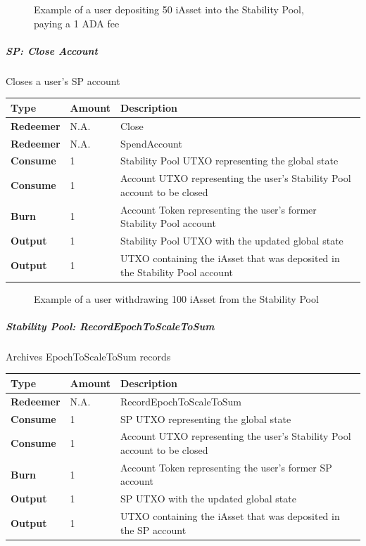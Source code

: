 \documentclass{article}
\begin{document}
\begin{sloppypar}
\hypertarget{sp-adjust-figure}{%
\begin{figure}[htbp]
\centering

\caption{Example of a user depositing 50 iAsset into the Stability
Pool, paying a 1 ADA fee}
\label{sp-adjust-figure}
\end{figure}}

\hypertarget{sp-close-account}{%
\subparagraph{SP: Close Account}\label{sp-close-account}}

Closes a user's SP account

\begin{tabularx}{\linewidth}{l|l|L}
\toprule
\textbf{Type} & \textbf{Amount} & \textbf{Description}
\tabularnewline
\midrule
\endhead
\textbf{Redeemer} & N.A. & Close
\tabularnewline
\midrule
\textbf{Redeemer} & N.A. & SpendAccount
\tabularnewline
\midrule
\textbf{Consume} & 1 & Stability Pool UTXO representing the global
state
\tabularnewline
\midrule
\textbf{Consume} & 1 & Account UTXO representing the user's Stability
Pool account to be closed
\tabularnewline
\midrule
\textbf{Burn} & 1 & Account Token representing the user's former
Stability Pool account
\tabularnewline
\midrule
\textbf{Output} & 1 & Stability Pool UTXO with the updated global
state
\tabularnewline
\midrule
\textbf{Output} & 1 & UTXO containing the iAsset that was deposited in
the Stability Pool account
\tabularnewline
\bottomrule
\end{tabularx}

\hypertarget{sp-close-figure}{%
\begin{figure}[htbp]
\centering

\caption{Example of a user withdrawing 100 iAsset from the
Stability Pool}
\label{sp-close-figure}
\end{figure}}

\hypertarget{stability-pool-recordepochtoscaletosum}{%
\subparagraph{Stability Pool:
RecordEpochToScaleToSum}\label{stability-pool-recordepochtoscaletosum}}

Archives EpochToScaleToSum records

\begin{tabularx}{\linewidth}{l|l|L}
\toprule
\textbf{Type} & \textbf{Amount} & \textbf{Description}
\tabularnewline
\midrule
\endhead
\textbf{Redeemer} & N.A. & RecordEpochToScaleToSum
\tabularnewline
\midrule
\textbf{Consume} & 1 & SP UTXO representing the global
state
\tabularnewline
\midrule
\textbf{Consume} & 1 & Account UTXO representing the user's Stability
Pool account to be closed
\tabularnewline
\midrule
\textbf{Burn} & 1 & Account Token representing the user's former SP
account
\tabularnewline
\midrule
\textbf{Output} & 1 & SP UTXO with the updated global
state
\tabularnewline
\midrule
\textbf{Output} & 1 & UTXO containing the iAsset that was deposited in
the SP account
\tabularnewline
\bottomrule
\end{tabularx}


\end{sloppypar}
\end{document}
